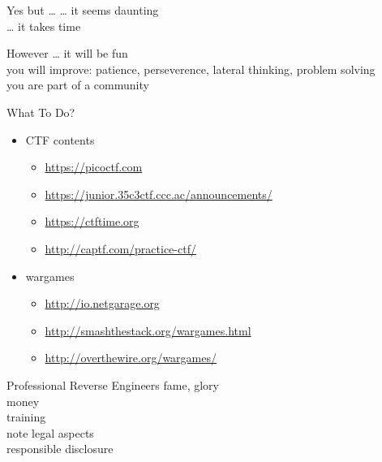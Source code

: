 \documentclass{simple}
\begin{document}
\begin{frame}{Yes but \ldots}
  \centering
  \pause \ldots{} it seems daunting \\
  \pause \ldots{} it takes time
\end{frame}

\begin{frame}{However \ldots}
  \centering
  \pause it will be fun \\
  \pause you will improve: patience, perseverence, lateral thinking, problem solving \\
  \pause you are part of a community
\end{frame}

\begin{frame}{What To Do?}
  \begin{itemize}
    \item \pause CTF contents
      \begin{itemize}
        \item \pause \url{https://picoctf.com}
        \item \pause \url{https://junior.35c3ctf.ccc.ac/announcements/}
        \item \pause \url{https://ctftime.org}
        \item \pause \url{http://captf.com/practice-ctf/}
      \end{itemize}
    \item \pause wargames
      \begin{itemize}
        \item \pause \url{http://io.netgarage.org}
        \item \pause \url{http://smashthestack.org/wargames.html}
        \item \pause \url{http://overthewire.org/wargames/}
      \end{itemize}
  \end{itemize}
\end{frame}

\begin{frame}{Professional Reverse Engineers}
  \centering
  \pause fame, glory \\
  \vspace{0.5cm}
  \pause money \\
  \vspace{0.5cm}
  \pause training \\
  \vspace{0.5cm}
  \pause note legal aspects \\
  \vspace{0.5cm}
  \pause responsible disclosure
\end{frame}
\end{document}
